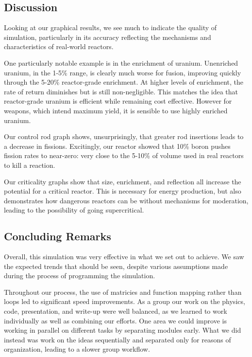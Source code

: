 \documentclass{notes}
\begin{document}
\subsection*{Discussion}

Looking at our graphical results, we see much to indicate the quality of simulation, particularly in its accuracy reflecting the mechanisms and characteristics of real-world reactors. 

One particularly notable example is in the enrichment of uranium. Unenriched uranium, in the 1-5\% range, is clearly much worse for fusion, improving quickly through the 5-20\% reactor-grade enrichment. At higher levels of enrichment, the rate of return diminishes but is still non-negligible. This matches the idea that reactor-grade uranium is efficient while remaining cost effective. However for weapons, which intend maximum yield, it is sensible to use highly enriched uranium.

Our control rod graph shows, unsurprisingly, that greater rod insertions leads to a decrease in fissions. Excitingly, our reactor showed that 10\% boron pushes fission rates to near-zero: very close to the 5-10\% of volume used in real reactors to kill a reaction.

Our criticality graphs show that size, enrichment, and reflection all increase the potential for a critical reactor. This is necessary for energy production, but also demonstrates how dangerous reactors can be without mechanisms for moderation, leading to the possibility of going supercritical.

\subsection*{Concluding Remarks}

Overall, this simulation was very effective in what we set out to achieve. We saw the expected trends that should be seen, despite various assumptions made during the process of programming the simulation.

Throughout our process, the use of matricies and function mapping rather than loops led to significant speed improvements. As a group our work on the physics, code, presentation, and write-up were well balanced, as we learned to work individually as well as combining our efforts. One area we could improve is working in parallel on different tasks by separating modules early. What we did instead was work on the ideas sequentially and separated only for reasons of organization, leading to a slower group workflow.
\end{document}
